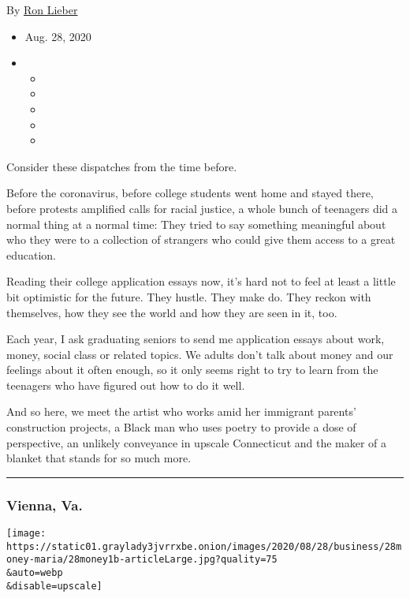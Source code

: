 By \href{https://www.nytimes3xbfgragh.onion/by/ron-lieber}{Ron Lieber}

\begin{itemize}
\item
  Aug. 28, 2020
\item
  \begin{itemize}
  \item
  \item
  \item
  \item
  \item
  \end{itemize}
\end{itemize}

Consider these dispatches from the time before.

Before the coronavirus, before college students went home and stayed
there, before protests amplified calls for racial justice, a whole bunch
of teenagers did a normal thing at a normal time: They tried to say
something meaningful about who they were to a collection of strangers
who could give them access to a great education.

Reading their college application essays now, it's hard not to feel at
least a little bit optimistic for the future. They hustle. They make do.
They reckon with themselves, how they see the world and how they are
seen in it, too.

Each year, I ask graduating seniors to send me application essays about
work, money, social class or related topics. We adults don't talk about
money and our feelings about it often enough, so it only seems right to
try to learn from the teenagers who have figured out how to do it well.

And so here, we meet the artist who works amid her immigrant parents'
construction projects, a Black man who uses poetry to provide a dose of
perspective, an unlikely conveyance in upscale Connecticut and the maker
of a blanket that stands for so much more.

\begin{center}\rule{0.5\linewidth}{\linethickness}\end{center}

\hypertarget{vienna-va}{%
\subsubsection{Vienna, Va.}\label{vienna-va}}

\texttt{[image: https://static01.graylady3jvrrxbe.onion/images/2020/08/28/business/28money-maria/28money1b-articleLarge.jpg?quality=75\\\&auto=webp\\\&disable=upscale]}

